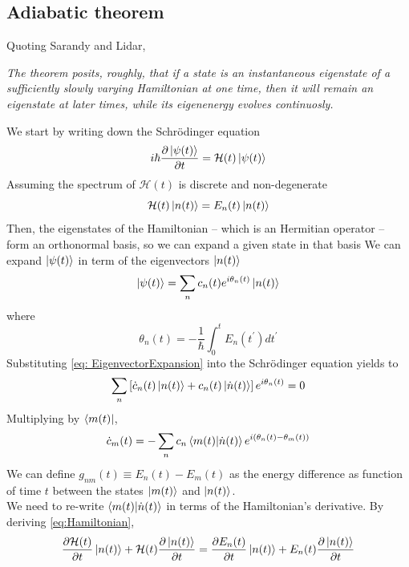 \subsection{Adiabatic theorem}
Quoting Sarandy and Lidar,
\begin{displayquote}
\textit{The theorem posits, roughly, that if a state is an instantaneous eigenstate of a sufficiently slowly varying Hamiltonian at one time, then it will remain an eigenstate at later times, while its eigenenergy evolves continuosly.}
\end{displayquote}
We start by writing down the Schrödinger equation
\begin{equation}
    i\hbar \frac{\partial \ket{\psi(t)}}{\partial t} = \mathcal{H}(t)\ket{\psi(t)}
\end{equation}
Assuming the spectrum of $\mathcal{H}(t)$ is discrete and non-degenerate
\begin{equation}
\label{eq:Hamiltonian}
    \mathcal{H}(t) \ket{n(t)} = E_{n}(t)\ket{n(t)}
\end{equation}
Then, the eigenstates of the Hamiltonian -- which is an Hermitian operator -- form an orthonormal basis, so we can expand a given state in that basis
We can expand $\ket{\psi(t)}$ in term of the eigenvectors $\ket{n(t)}$
\begin{equation}
\label{eq: EigenvectorExpansion}
    \ket{\psi(t)} = \sum_{n}c_{n}(t)e^{i\theta_{n}(t)} \ket{n(t)}
\end{equation}
where
\begin{equation}
    \theta_{n}(t) = -\frac{1}{\hbar}\int_{0}^{t}E_{n}(t^{\prime})dt^{\prime}
\end{equation}
Substituting \ref{eq: EigenvectorExpansion} into the Schrödinger equation yields to
\begin{equation}
    \sum_{n}\left[\dot{c}_{n}(t)\ket{n(t)} + c_{n}(t)\ket{\dot{n}(t)}\right]e^{i\theta_{n}(t)} = 0
\end{equation}
Multiplying by $\bra{m(t)}$,
\begin{equation}
\label{eq:Coefficients}
    \dot{c}_{m}(t) = - \sum_{n}c_{n}\braket{m(t)|\dot{n}(t)}e^{i\left(\theta_{n}(t) - \theta_{m}(t)\right)}
\end{equation}
We can define $g_{nm}(t)\equiv E_{n}(t) - E_{m}(t)$ as the energy difference as function of time $t$ between the states $\ket{m(t)}$ and $\ket{n(t)}$.\\
We need to re-write $\braket{m(t)|\dot{n}(t)}$ in terms of the Hamiltonian's derivative. By deriving \ref{eq:Hamiltonian},
\begin{equation}
    \frac{\partial \mathcal{H}(t)}{\partial t}\ket{n(t)} + \mathcal{H}(t)\frac{\partial \ket{n(t)}}{\partial t} = \frac{\partial E_{n}(t)}{\partial t} \ket{n(t)} + E_{n}(t)\frac{\partial \ket{n(t)}}{\partial t} 
\end{equation}
